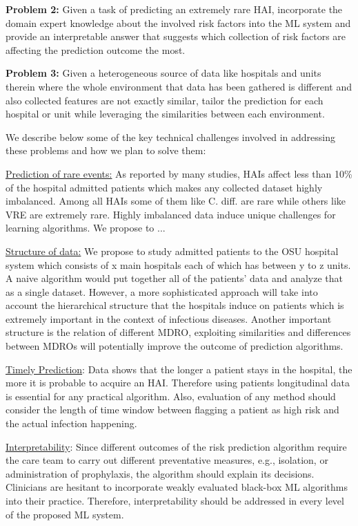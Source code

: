 {\noindent \bf Problem 2:} Given a task of predicting an extremely rare HAI, incorporate the domain expert knowledge about the involved risk factors into the ML system and provide an interpretable answer that suggests which collection of risk factors are affecting the prediction outcome the most.

{\noindent \bf Problem 3:} Given a heterogeneous source of data like hospitals and units therein where the whole environment that data has been gathered is different and also collected features are not exactly similar, tailor the prediction for each hospital or unit while leveraging the similarities between each environment.

We describe below some of the key technical challenges involved in addressing these problems and how we plan to solve them:

\underline{Prediction of rare events:} As reported by many studies, HAIs affect less than 10\% of the hospital admitted patients which makes any collected dataset highly imbalanced. Among all HAIs some of them like C. diff. are rare while others like VRE are extremely rare. Highly imbalanced data induce unique challenges for learning algorithms. We propose to ...

\underline{Structure of data:} We propose to study admitted patients to the OSU hospital system which consists of x main hospitals each of which has between y to z units. A naive algorithm would put together all of the patients' data and analyze that as a single dataset. However, a more sophisticated approach will take into account the hierarchical structure that the hospitals induce on patients which is extremely important in the context of infectious diseases. Another important structure is the relation of different MDRO, exploiting similarities and differences between MDROs will potentially improve the outcome of prediction algorithms.

\underline{Timely Prediction}: Data shows that the longer a patient stays in the hospital, the more it is probable to acquire an HAI. Therefore using patients longitudinal data is essential for any practical algorithm. Also, evaluation of any method should consider the length of time window between flagging a patient as high risk and the actual infection happening.

\underline{Interpretability}: Since different outcomes of the risk prediction algorithm require the care team to carry out different preventative measures, e.g., isolation, or administration of prophylaxis, the algorithm should explain its decisions. Clinicians are hesitant to incorporate weakly evaluated black-box ML algorithms into their practice. Therefore, interpretability should be addressed in every level of the proposed ML system.

